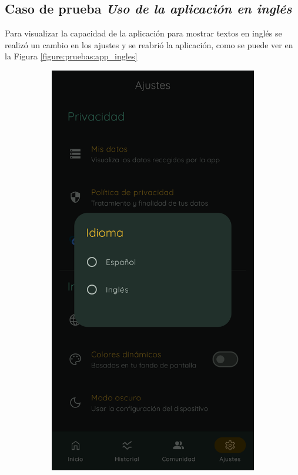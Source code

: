             \clearpage  %
        \subsection*{Caso de prueba \textit{Uso de la aplicación en inglés}}
            Para visualizar la capacidad de la aplicación para mostrar textos en inglés se realizó un cambio en los ajustes y se reabrió la aplicación, como se puede ver en la Figura \ref{figure:pruebas:app_ingles}

            \begin{figure}[htbp]
                \centering
                \begin{subfigure}[c]{0.4\textwidth}
                    \centering
                    \includegraphics[width=1\textwidth]{figures/pruebas/ingles/Dialogo.png}

\end{subfigure}
\end{figure}
